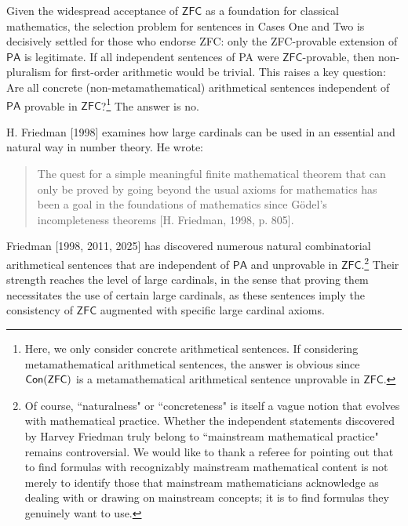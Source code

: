 \documentclass[a4paper,12pt]{amsart}
\theoremstyle{definition}
\numberwithin{equation}{section}
\begin{document}
Given the widespread acceptance of $\mathsf{ZFC}$ as a foundation for classical mathematics, the selection problem for sentences in Cases One and Two is decisively settled for those who endorse {\sf ZFC}: only the {\sf ZFC}-provable extension of $\mathsf{PA}$ is legitimate. If all independent sentences of {\sf PA} were $\mathsf{ZFC}$-provable, then non-pluralism for first-order arithmetic would be trivial. This raises a key question: Are all concrete (non-metamathematical) arithmetical sentences independent of $\mathsf{PA}$ provable in $\mathsf{ZFC}$?\footnote{Here, we only consider concrete arithmetical sentences. If considering metamathematical arithmetical sentences, the answer is obvious since ${\sf Con(ZFC)}$ is a metamathematical arithmetical sentence unprovable in $\mathsf{ZFC}$.} The answer is no.

H. Friedman [1998] examines how large cardinals can be used in an essential and natural way in number theory. He wrote: 
\begin{quote} 
\small
The quest for a simple meaningful finite mathematical theorem that can only be proved by going beyond the usual axioms for mathematics has been a
goal in the foundations of mathematics since G\"{o}del's incompleteness theorems [H. Friedman,  1998, p. 805].
\end{quote}
                                
Friedman [1998, 2011, 2025] has discovered numerous natural combinatorial arithmetical sentences that are independent of $\mathsf{PA}$ and unprovable in $\mathsf{ZFC}$.\footnote{Of course, ``naturalness" or ``concreteness" is itself a vague notion that evolves with mathematical practice. Whether the independent statements discovered by Harvey Friedman truly belong to ``mainstream mathematical practice" remains controversial. We would like to thank a referee for pointing out that to find formulas with recognizably mainstream mathematical content is not merely to identify those that mainstream mathematicians acknowledge as dealing with or drawing on mainstream concepts; it is to find formulas they genuinely want to use.} Their strength reaches the level of large cardinals, in the sense that proving them necessitates the use of certain  large cardinals, as these sentences imply the consistency of $\mathsf{ZFC}$ augmented with specific large cardinal axioms.  
\end{document}
